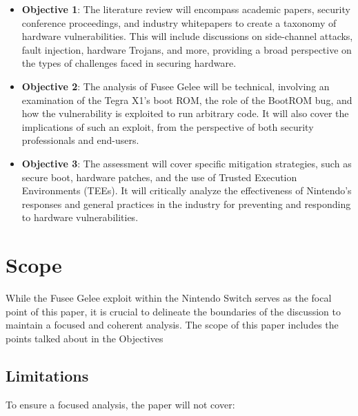 \begin{itemize}
\item
  \textbf{Objective 1}: The literature review will encompass academic papers, security conference proceedings, and industry whitepapers to create a taxonomy of hardware vulnerabilities. This will include discussions on side-channel attacks, fault injection, hardware Trojans, and more, providing a broad perspective on the types of challenges faced in securing hardware.
\item
  \textbf{Objective 2}: The analysis of Fusee Gelee will be technical, involving an examination of the Tegra X1's boot ROM, the role of the BootROM bug, and how the vulnerability is exploited to run arbitrary code. It will also cover the implications of such an exploit, from the perspective of both security professionals and end-users.
\item
  \textbf{Objective 3}: The assessment will cover specific mitigation strategies, such as secure boot, hardware patches, and the use of Trusted Execution Environments (TEEs). It will critically analyze the effectiveness of Nintendo's responses and general practices in the industry for preventing and responding to hardware vulnerabilities.
\end{itemize}

\hypertarget{scope}{%
\section{Scope}\label{scope}}

While the Fusee Gelee exploit within the Nintendo Switch serves as the
focal point of this paper, it is crucial to delineate the boundaries of
the discussion to maintain a focused and coherent analysis. The scope of
this paper includes the points talked about in the Objectives

\hypertarget{limitations}{%
\subsection{Limitations}\label{limitations}}

To ensure a focused analysis, the paper will not cover:

